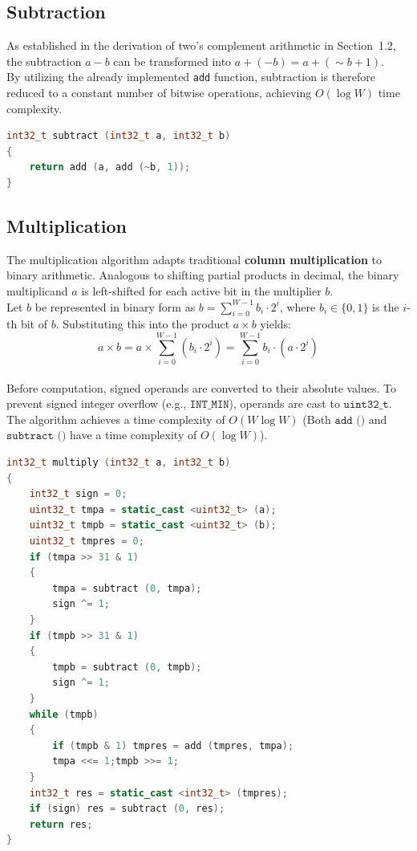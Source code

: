 \documentclass[11pt]{article}
\begin{document}
\subsection{Subtraction}
As established in the derivation of two's complement arithmetic in Section~1.2, the subtraction $a - b$ can be transformed into $a + (-b) = a + (\sim b + 1)$. 
\vspace{3pt}\\
By utilizing the already implemented \texttt{add} function, subtraction is therefore reduced to a constant number of bitwise operations, achieving $O(\log W)$ time complexity.
\vspace{3pt}
\begin{lstlisting}[language=C++]
int32_t subtract (int32_t a, int32_t b)
{
    return add (a, add (~b, 1));
}
\end{lstlisting}

\subsection{Multiplication}
The multiplication algorithm adapts traditional \textbf{column multiplication} to binary arithmetic. Analogous to shifting partial products in decimal, the binary multiplicand $a$ is left-shifted for each active bit in the multiplier $b$.
\vspace{3pt}\\
Let $b$ be represented in binary form as $b = \sum\limits_{i=0}^{W-1} b_i \cdot 2^i$, where $b_i \in \{0, 1\}$ is the $i$-th bit of $b$. Substituting this into the product $a \times b$ yields:
\[
a \times b = a \times \sum_{i=0}^{W - 1} (b_i \cdot 2^i) = \sum_{i=0}^{W - 1} b_i \cdot (a \cdot 2^i)
\]
\vspace{3pt}\\
Before computation, signed operands are converted to their absolute values. To prevent signed integer overflow (e.g., $\texttt{INT\_MIN}$), operands are cast to $\texttt{uint32\_t}$.
\vspace{3pt}\\
The algorithm achieves a time complexity of \textbf{$O(W \log W)$} (Both $\texttt{add ()}$ and $\texttt{subtract ()}$ have a time complexity of $O(\log W)$).
\vspace{8pt}
\begin{lstlisting}[language=C++]
int32_t multiply (int32_t a, int32_t b)
{
    int32_t sign = 0;
    uint32_t tmpa = static_cast <uint32_t> (a);
    uint32_t tmpb = static_cast <uint32_t> (b);
    uint32_t tmpres = 0;
    if (tmpa >> 31 & 1) 
    {
        tmpa = subtract (0, tmpa);
        sign ^= 1;
    }
    if (tmpb >> 31 & 1)
    {
        tmpb = subtract (0, tmpb);
        sign ^= 1;
    }
    while (tmpb)
    {
        if (tmpb & 1) tmpres = add (tmpres, tmpa);
        tmpa <<= 1;tmpb >>= 1;
    }
    int32_t res = static_cast <int32_t> (tmpres);
    if (sign) res = subtract (0, res);
    return res;
}
\end{lstlisting}
\newpage
\end{document}
